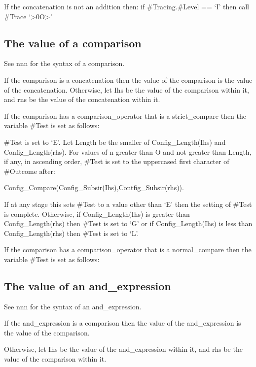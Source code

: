 If the concatenation is not an addition then: if \#Tracing.\#Level ==
`I' then call \#Trace `\textgreater0O\textgreater{}'

\subsection{The value of a comparison}\label{the-value-of-a-comparison}

See nnn for the syntax of a comparison.

If the comparison is a concatenation then the value of the comparison is
the value of the concatenation. Otherwise, let Ihs be the value of the
comparison within it, and rns be the value of the concatenation within
it.

If the comparison has a comparison\_operator that is a strict\_compare
then the variable \#Test is set as follows:

\#Test is set to `E'. Let Length be the smaller of Config\_Length(Ihs)
and Config\_Length(rhs). For values of n greater than O and not greater
than Length, if any, in ascending order, \#Test is set to the uppercased
first character of \#Outcome after:

Config\_Compare(Config\_Subsir(Ihs),Contfig\_Subsir(rhs)).

If at any stage this sets \#Test to a value other than `E' then the
setting of \#Test is complete. Otherwise, if Config\_Length(Ihs) is
greater than Config\_Length(rhs) then \#Test is set to `G' or if
Config\_Length(Ihs) is less than Config\_Length(rhs) then \#Test is set
to `L'.

If the comparison has a comparison\_operator that is a normal\_compare
then the variable \#Test is set as follows:


\subsection{The value of an
and\_expression}\label{the-value-of-an-and_expression}

See nnn for the syntax of an and\_expression.

If the and\_expression is a comparison then the value of the
and\_expression is the value of the comparison.

Otherwise, let Ihs be the value of the and\_expression within it, and
rhs be the value of the comparison within it.

